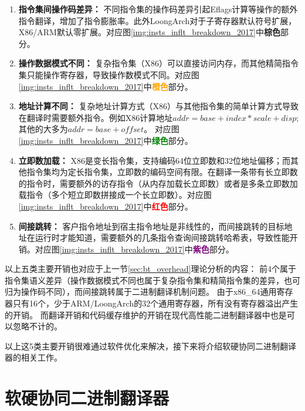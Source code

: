 \begin{enumerate}
  \item \textbf{指令集间操作码差异：} 不同指令集的操作码差异引起Eflags计算等操作的额外指令翻译，增加了指令膨胀率。此外LoongArch对于子寄存器默认符号扩展，X86/ARM默认零扩展。对应图\ref{img:insts_inflt_breakdown_2017}中\textcolor{Sepia}{\textbf{棕色}}部分。
  
  \item \textbf{操作数据模式不同：} 复杂指令集（X86）可以直接访问内存，而其他精简指令集只能操作寄存器，导致操作数模式不同。对应图\ref{img:insts_inflt_breakdown_2017}中\textcolor{orange}{\textbf{橙色}}部分。
  
  \item \textbf{地址计算不同：} 复杂地址计算方式（X86）与其他指令集的简单计算方式导致在翻译时需要额外指令。例如X86计算地址$addr = base + index * scale +disp$; 其他的大多为$addr = base + offset$。 对应图\ref{img:insts_inflt_breakdown_2017}中\textcolor{green}{\textbf{绿色}}部分。
  
  \item \textbf{立即数加载：} X86是变长指令集，支持编码64位立即数和32位地址偏移；而其他指令集均为定长指令集，立即数的编码空间有限。在翻译一条带有长立即数的指令时，需要额外的访存指令（从内存加载长立即数）或者是多条立即数加载指令（多个短立即数拼接成一个长立即数）。对应图\ref{img:insts_inflt_breakdown_2017}中\textcolor{red}{\textbf{红色}}部分。
  
  \item \textbf{间接跳转：} 客户指令地址到宿主指令地址是非线性的，而间接跳转的目标地址在运行时才能知道，需要额外的几条指令查询间接跳转哈希表，导致性能开销。对应图\ref{img:insts_inflt_breakdown_2017}中\textcolor{Purple}{\textbf{紫色}}部分。
  
\end{enumerate}

以上五类主要开销也对应于上一节\ref{sec:bt_overhead}理论分析的内容：
前4个属于指令集语义差异（操作数据模式不同也属于复杂指令集和精简指令集的差异，也可归为操作码不同），而间接跳转属于二进制翻译机制问题。
由于x86\_64通用寄存器只有16个，少于ARM/LoongArch的32个通用寄存器，所有没有寄存器溢出产生的开销。
而翻译开销和代码缓存维护的开销在现代高性能二进制翻译器中也是可以忽略不计的。

以上这5类主要开销很难通过软件优化来解决，接下来将介绍软硬协同二进制翻译器的相关工作。

\section{软硬协同二进制翻译器}

